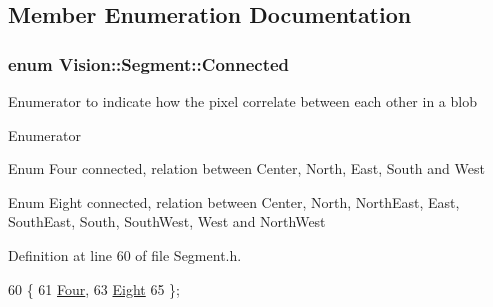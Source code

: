 \subsection{Member Enumeration Documentation}
\hypertarget{class_vision_1_1_segment_a330240c08320e72270fac0aa83d5e27e}{}
\subsubsection[{Connected}]{\setlength{\rightskip}{0pt plus 5cm}enum {\bf Vision\+::\+Segment\+::\+Connected}}\label{class_vision_1_1_segment_a330240c08320e72270fac0aa83d5e27e}
Enumerator to indicate how the pixel correlate between each other in a blob \begin{Desc}
\item[Enumerator]\par
\begin{description}
\item[{\em 
\hypertarget{class_vision_1_1_segment_a330240c08320e72270fac0aa83d5e27ea1fca5ab1c285c0edd2bdc3072cab0c01}{}Four\label{class_vision_1_1_segment_a330240c08320e72270fac0aa83d5e27ea1fca5ab1c285c0edd2bdc3072cab0c01}
}]Enum Four connected, relation between Center, North, East, South and West \item[{\em 
\hypertarget{class_vision_1_1_segment_a330240c08320e72270fac0aa83d5e27eae8e2b0fa6d15448f10cddc0390284a39}{}Eight\label{class_vision_1_1_segment_a330240c08320e72270fac0aa83d5e27eae8e2b0fa6d15448f10cddc0390284a39}
}]Enum Eight connected, relation between Center, North, North\+East, East, South\+East, South, South\+West, West and North\+West \end{description}
\end{Desc}


Definition at line 60 of file Segment.\+h.


\begin{DoxyCode}
60                  \{
61     \hyperlink{class_vision_1_1_segment_a330240c08320e72270fac0aa83d5e27ea1fca5ab1c285c0edd2bdc3072cab0c01}{Four}, 
63     \hyperlink{class_vision_1_1_segment_a330240c08320e72270fac0aa83d5e27eae8e2b0fa6d15448f10cddc0390284a39}{Eight} 
65   \};
\end{DoxyCode}
\hypertarget{class_vision_1_1_segment_af3a2b992526eac54bca53e34cf2db4da}{}
